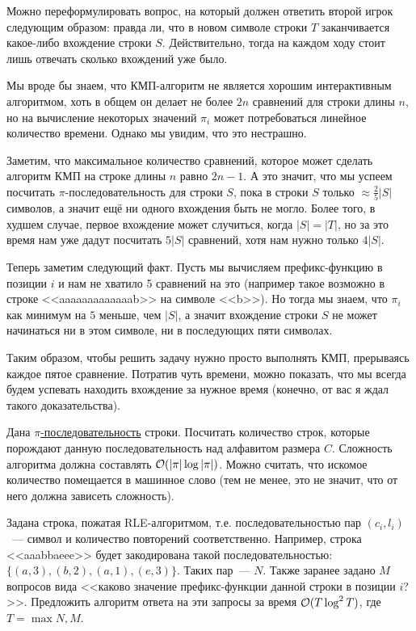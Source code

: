 \documentclass[addpoints]{exam}
\begin{document}
\begin{questions}
\begin{solution}

Можно переформулировать вопрос, на который должен ответить второй игрок следующим образом: правда ли, что в новом символе строки $T$ заканчивается какое-либо вхождение строки $S$. Действительно, тогда на каждом ходу стоит лишь отвечать сколько вхождений уже было.

Мы вроде бы знаем, что КМП-алгоритм не является хорошим интерактивным алгоритмом, хоть в общем он делает не более $2n$ сравнений для строки длины $n$, но на вычисление некоторых значений $\pi_{i}$ может потребоваться линейное количество времени. Однако мы увидим, что это нестрашно.

Заметим, что максимальное количество сравнений, которое может сделать алгоритм КМП на строке длины $n$ равно $2n - 1$. А это значит, что мы успеем посчитать $\pi$-последовательность для строки $S$, пока в строки $S$ только $\approx \frac{2}{5} |S|$ символов, а значит ещё ни одного вхождения быть не могло.
Более того, в худшем случае, первое вхождение может случиться, когда $|S| = |T|$, но за это время нам уже дадут посчитать $5|S|$ сравнений, хотя нам нужно только $4|S|$.

Теперь заметим следующий факт. Пусть мы вычисляем префикс-функцию в позиции $i$ и нам не хватило 5 сравнений на это (например такое возможно в строке <<aaaaaaaaaaaaab>> на символе <<b>>). Но тогда мы знаем, что $\pi_i$ как минимум на $5$ меньше, чем $|S|$, а значит вхождение строки $S$ не может начинаться ни в этом символе, ни в последующих пяти символах.

Таким образом, чтобы решить задачу нужно просто выполнять КМП, прерываясь каждое пятое сравнение. Потратив чуть времени, можно показать, что мы всегда будем успевать находить вхождение за нужное время (конечно, от вас я ждал такого доказательства).

\end{solution}

\question[1 \half] Дана \hyperref[piseq]{$\pi$-последовательность} строки. Посчитать количество строк, которые порождают данную последовательность над алфавитом размера $C$. Сложность алгоритма должна составлять $\mathcal{O}(|\pi| \log{|\pi|})$. Можно считать, что искомое количество помещается в машинное слово (тем не менее, это не значит, что от него должна зависеть сложность).

\question[1 \half] Задана строка, пожатая RLE-алгоритмом, т.е. последовательностью пар $(c_i, l_i)$~--- символ и количество повторений соответственно. Например, строка <<aaabbaeee>> будет закодирована такой последовательностью: $\{(a, 3), (b,2), (a,1), (e,3)\}$. Таких пар~--- $N$. Также заранее задано $M$ вопросов вида <<каково значение префикс-функции данной строки в позиции $i$?>>. Предложить алгоритм ответа на эти запросы за время $\mathcal{O}( T \log^2{T})$, где $T = \max{N,M}$. 


\end{questions}
\end{document}
